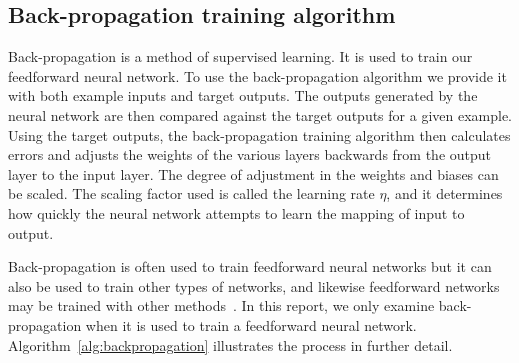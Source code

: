 \documentclass[11pt]{article}
\begin{document}

\subsection{Back-propagation training algorithm} %
\label{sub:backpropagation_training_algorithm}

Back-propagation is a method of supervised learning. It is used to train our feedforward neural network. To use the back-propagation
algorithm we provide it with both example inputs and target outputs. The outputs generated by the neural network are then compared
against the target outputs for a given example. Using the target outputs, the back-propagation training
algorithm then calculates errors and adjusts the weights of the various layers backwards from the output layer to the input layer. The
degree of adjustment in the weights and biases can be scaled. The scaling factor used is called the learning rate $\eta$, and it
determines how quickly the neural network attempts to learn the mapping of input to output.~\cite{Backprop, skapura}

Back-propagation is often used to train feedforward neural networks but it can also be used to train other types of networks, and
likewise feedforward networks may be trained with other methods~\cite{Backprop, skapura}. In this report, we only examine
back-propagation when it is used to train a feedforward neural network. Algorithm~\ref{alg:backpropagation} illustrates the process in
further detail.
\end{document}
